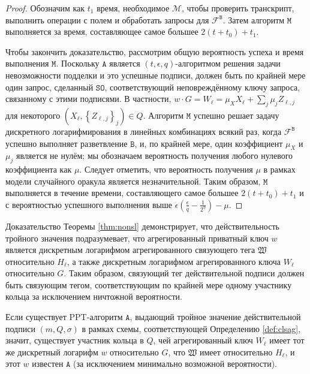 \documentclass{llncs}
\newcommand{\A}{\texttt{A}}
\newcommand{\B}{\texttt{B}}
\begin{document}
\begin{proof}
Обозначим как $t_1$ время, необходимое $\mathcal{M}$, чтобы проверить транскрипт, выполнить операции с полем и обработать запросы для $\mathcal{F}^{\B}$. Затем алгоритм $\texttt{M}$ выполняется за время, составляющее самое большее $2(t+t_0) + t_1$.

Чтобы закончить доказательство, рассмотрим общую вероятность успеха и время выполнения $\texttt{M}$. Поскольку $\A$ является $(t, \epsilon, q)$-алгоритмом решения задачи невозможности подделки  и это успешные подписи, должен быть по крайней мере один запрос, сделанный $\texttt{SO}$, соответствующий неповреждённому ключу запроса, связанному с этими подписями. В частности, $w \cdot G = W_\ell = \mu_X X_\ell + \sum_j \mu_j Z_{\ell,j}$ для некоторого $(X_\ell, \left\{Z_{\ell, j}\right\}_j) \in Q$. Алгоритм $\texttt{M}$ успешно решает задачу дискретного логарифмирования в линейных комбинациях всякий раз, когда $\mathcal{F}^{\B}$ успешно выполняет разветвление $\B$, и, по крайней мере, один коэффициент $\mu_X$ и $\mu_j$ является не нулём; мы обозначаем вероятность получения любого нулевого коэффициента как $\mu$. Следует отметить, что вероятность получения $\mu$ в рамках модели случайного оракула является незначительной. Таким образом, $\texttt{M}$ выполняется в течение времени, составляющего самое большее $2(t+t_0) + t_1$ и с вероятностью успешного выполнения выше $\epsilon\left(\frac{\epsilon}{q} - \frac{1}{2^\eta}\right) - \mu$.
\end{proof}

Доказательство Теоремы \ref{thm:nonsl} демонстрирует, что действительность тройного значения подразумевает, что агрегированный приватный ключ $w$ является дискретным логарифмом агрегированного связующего тега $\mathfrak{W}$ относительно $H_\ell$, а также дискретным логарифмом агрегированного ключа $W_\ell$ относительно $G$. Таким образом, связующий тег действительной подписи должен быть связующим тегом, соответствующим по крайней мере одному участнику кольца за исключением ничтожной вероятности.

\begin{corollary}\label{cor:no-aliens}
Если существует PPT-алгоритм $\A$, выдающий тройное значение действительной подписи $(m, Q, \sigma)$ в рамках схемы, соответствующей Определению \ref{def:clsag}, значит, существует участник кольца в $Q$, чей агрегированный ключ $W_\ell$ имеет тот же дискретный логарифм $w$ относительно $G$, что $\mathfrak{W}$ имеет относительно $H_\ell$, и этот $w$ известен $\A$ (за исключением минимально возможной вероятности).
\end{corollary}
\end{document}
